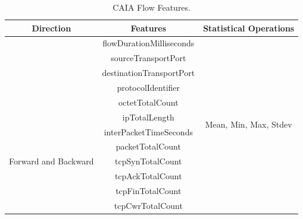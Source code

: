 \documentclass[9pt,sigconf,letterpaper,dvipsnames\ifx\removeHeaders\tempYes ,nonacm\fi]{acmart}
\begin{document}
\begin{table}[ht!]
	
	\centering
	\caption{CAIA Flow Features.}
	\label{tab:cres}
	     
	\footnotesize
	\begin{tabular}{|c|c|c|}
		\toprule
		\textbf{Direction}                    & \textbf{Features}        & \textbf{Statistical Operations}        \\
		\midrule
		    
		                                      & flowDurationMilliseconds &                                        \\
		                                      & sourceTransportPort      &                                        \\
		                                      & destinationTransportPort &                                        \\
		                                      & protocolIdentifier       &                                        \\
		                                      & octetTotalCount          &                                        \\
		\midrule
		\multirow{7}{*}{Forward and Backward} & ipTotalLength            & \multirow{2}{*}{Mean, Min, Max, Stdev} \\
		                                      & interPacketTimeSeconds   &                                        \\
		\cmidrule{2-3}
		                                      & packetTotalCount         &                                        \\
		                                      & tcpSynTotalCount         &                                        \\
		                                      & tcpAckTotalCount         &                                        \\
		                                      & tcpFinTotalCount         &                                        \\
		                                      & tcpCwrTotalCount         &                                        \\
		   
		\midrule
		
		
	\end{tabular}
		
\end{table}
\end{document}
